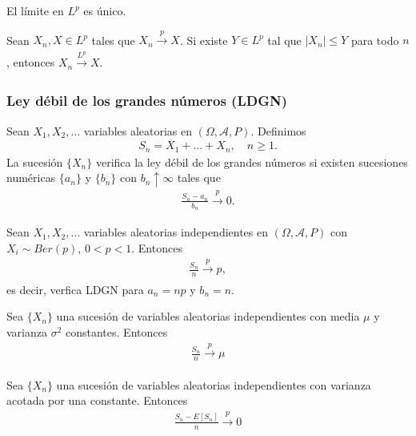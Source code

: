 \begin{teo}
    El límite en $L^p$ es único.
\end{teo}

\begin{teo}
    Sean $X_n, X \in L^p$ tales que $X_n \xrightarrow[]{p} X$. Si existe $Y \in L^p$ tal que $|X_n| \leq Y$ para todo $n$, entonces $X_n \xrightarrow[]{L^p} X$.
\end{teo}

\subsubsection{Ley débil de los grandes números (LDGN)}
\noindent Sean $X_1,X_2,\ldots$ variables aleatorias en $(\Omega, \mathcal{A}, P)$. Definimos
\begin{align*}
    S_n = X_1 + \ldots + X_n, \quad n \ge 1.
\end{align*}
La sucesión $\{X_n\}$ verifica la ley débil de los grandes números si existen sucesiones numéricas $\{a_n\}$ y $\{b_n\}$ con $b_n \uparrow \infty$ tales que
\begin{align*}
    \frac{S_n - a_n}{b_n} \xrightarrow[\quad]{p} 0.
\end{align*}

\begin{teo}[Bernoulli, 1713]
     Sean $X_1,X_2,\ldots$ variables aleatorias independientes en $(\Omega, \mathcal{A}, P)$ con $X_i \sim Ber(p)$, $0<p<1$. Entonces
     \begin{align*}
         \frac{S_n}{n} \xrightarrow[\quad]{p} p,
     \end{align*}
     es decir, verfica LDGN para $a_n = np$ y $b_n = n$.
\end{teo}

\begin{teo}[Chebyshev]
    Sea $\{X_n\}$ una sucesión de variables aleatorias independientes con media $\mu$ y varianza $\sigma^2$ constantes. Entonces
    \begin{align*}
        \frac{S_n}{n} \xrightarrow[\quad]{p} \mu
    \end{align*}
\end{teo}

\begin{teo}[Chebyshev]
    Sea $\{X_n\}$ una sucesión de variables aleatorias independientes con varianza acotada por una constante. Entonces
    \begin{align*}
        \frac{S_n - E[S_n]}{n} \xrightarrow[\quad]{p} 0
    \end{align*}
\end{teo}

